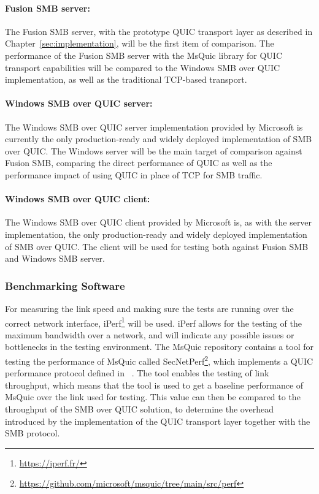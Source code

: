 \documentclass[english, 12pt, a4paper, elec, utf8, a-2b, online]{aaltothesis}
\begin{document}
\paragraph{Fusion SMB server:}

The Fusion SMB server, with the prototype QUIC transport layer as described in
Chapter~\ref{sec:implementation}, will be the first item of comparison. The performance
of the Fusion SMB server with the MsQuic library for QUIC transport capabilities will
be compared to the Windows SMB over QUIC implementation, as well as the traditional
TCP-based transport.

\paragraph{Windows SMB over QUIC server:}

The Windows SMB over QUIC server implementation provided by Microsoft is currently
the only production-ready and widely deployed implementation of SMB over QUIC. The
Windows server will be the main target of comparison
against Fusion SMB, comparing the direct performance of QUIC as well as the performance
impact of using QUIC in place of TCP for SMB traffic.

\paragraph{Windows SMB over QUIC client:}

The Windows SMB over QUIC client provided by Microsoft is, as with the server implementation,
the only production-ready and widely deployed implementation of SMB over QUIC. The client
will be used for testing both against Fusion SMB and Windows SMB server.

\subsubsection{Benchmarking Software}

For measuring the link speed and making sure the tests are running over the correct
network interface, iPerf\footnote{\url{https://iperf.fr/}} will be used. iPerf allows
for the testing of the maximum bandwidth over a network, and will indicate any
possible issues or bottlenecks in the testing environment.
The MsQuic repository contains a tool for testing the performance of MsQuic called
SecNetPerf\footnote{\url{https://github.com/microsoft/msquic/tree/main/src/perf}},
which implements a QUIC performance protocol defined in ~\cite{banks-quic-performance-00}.
The tool enables the testing of link throughput, which means that the tool is used
to get a baseline performance of MsQuic over the link used for testing. This value can then
be compared to the throughput of the SMB over QUIC solution, to determine the overhead
introduced by the implementation of the QUIC transport layer together with the SMB protocol.
\end{document}
